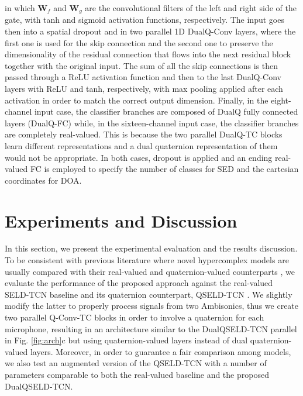 \documentclass[3p, preprint, twocolumn]{elsarticle}
\begin{document}
\noindent in which $\mathbf{W}_f$ and $\mathbf{W}_g$ are the convolutional filters of the left and right side of the gate, with tanh and sigmoid activation functions, respectively. The input goes then into a spatial dropout and in two parallel 1D DualQ-Conv layers, where the first one is used for the skip connection and the second one to preserve the dimensionality of the residual connection that flows into the next residual block together with the original input. The sum of all the skip connections is then passed through a ReLU activation function and then to the last DualQ-Conv layers with ReLU and tanh, respectively, with max pooling applied after each activation in order to match the correct output dimension. Finally, in the eight-channel input case, the classifier branches are composed of DualQ fully connected layers (DualQ-FC) while, in the sixteen-channel input case, the classifier branches are completely real-valued. This is because the two parallel DualQ-TC blocks learn different representations and a dual quaternion representation of them would not be appropriate. In both cases, dropout is applied and an ending real-valued FC is employed to specify the number of classes for SED and the cartesian coordinates for DOA.






\section{Experiments and Discussion}
\label{sec:exp}

In this section, we present the experimental evaluation and the results discussion. To be consistent with previous literature where novel hypercomplex models are usually compared with their real-valued and quaternion-valued counterparts \cite{grassucci2021lightweight}, we evaluate the performance of the proposed approach against the real-valued SELD-TCN baseline \cite{SELD-TCN} and its quaternion counterpart, QSELD-TCN \cite{Brignone2022ISCAS}. We slightly modify the latter to properly process signals from two Ambisonics, thus we create two parallel Q-Conv-TC blocks in order to involve a quaternion for each microphone, resulting in an architecture similar to the DualQSELD-TCN parallel in Fig. \ref{fig:arch}c but using quaternion-valued layers instead of dual quaternion-valued layers. Moreover, in order to guarantee a fair comparison among models, we also test an augmented version of the QSELD-TCN with a number of parameters comparable to both the real-valued baseline and the proposed DualQSELD-TCN.
\end{document}

